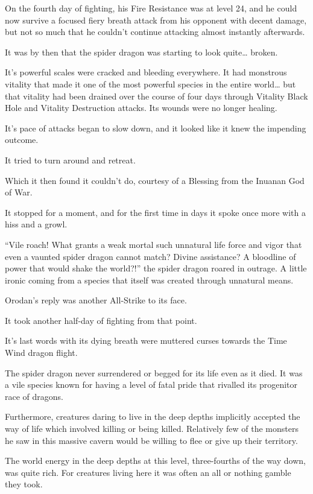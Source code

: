 \documentclass[a4paper,10pt]{book}
\begin{document}
On the fourth day of fighting, his Fire Resistance was at level 24, and he could now survive a focused fiery breath attack from his opponent with decent damage, but not so much that he couldn’t continue attacking almost instantly afterwards.\par
It was by then that the spider dragon was starting to look quite… broken.\par
It’s powerful scales were cracked and bleeding everywhere. It had monstrous vitality that made it one of the most powerful species in the entire world… but that vitality had been drained over the course of four days through Vitality Black Hole and Vitality Destruction attacks. Its wounds were no longer healing.\par
It’s pace of attacks began to slow down, and it looked like it knew the impending outcome.\par
It tried to turn around and retreat.\par
Which it then found it couldn’t do, courtesy of a Blessing from the Inuanan God of War.\par
It stopped for a moment, and for the first time in days it spoke once more with a hiss and a growl.\par
“Vile roach! What grants a weak mortal such unnatural life force and vigor that even a vaunted spider dragon cannot match? Divine assistance? A bloodline of power that would shake the world?!” the spider dragon roared in outrage. A little ironic coming from a species that itself was created through unnatural means.\par
Orodan’s reply was another All-Strike to its face.\par
It took another half-day of fighting from that point.\par
It’s last words with its dying breath were muttered curses towards the Time Wind dragon flight.\par
The spider dragon never surrendered or begged for its life even as it died. It was a vile species known for having a level of fatal pride that rivalled its progenitor race of dragons.\par
Furthermore, creatures daring to live in the deep depths implicitly accepted the way of life which involved killing or being killed. Relatively few of the monsters he saw in this massive cavern would be willing to flee or give up their territory.\par
The world energy in the deep depths at this level, three-fourths of the way down, was quite rich. For creatures living here it was often an all or nothing gamble they took.\par
\end{document}
